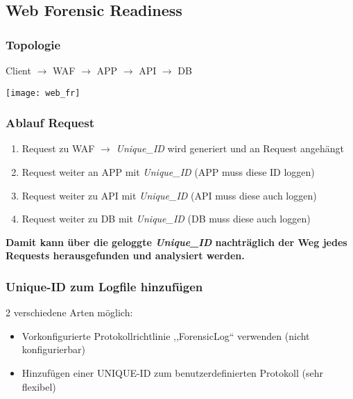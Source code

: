 \subsection{Web Forensic Readiness}

\subsubsection{Topologie}
Client $\rightarrow$ WAF $\rightarrow$ APP $\rightarrow$ API $\rightarrow$ DB

\begin{center}
    \texttt{[image: web\_fr]}
    \vspace{-8pt}
\end{center}

\subsubsection{Ablauf Request}
\begin{enumerate}
    \item Request zu WAF $\rightarrow$ \textit{Unique\_ID} wird generiert und an Request \glqq angehängt\grqq
    \item Request weiter an APP mit \textit{Unique\_ID} (APP muss diese ID loggen)
    \item Request weiter zu API mit \textit{Unique\_ID} (API muss diese auch loggen)
    \item Request weiter zu DB mit \textit{Unique\_ID} (DB muss diese auch loggen)\\
\end{enumerate}

\textbf{Damit kann über die geloggte \textit{Unique\_ID} nachträglich der Weg jedes Requests herausgefunden und analysiert werden.}

\subsubsection{Unique-ID zum Logfile hinzufügen}
2 verschiedene Arten möglich:
\begin{itemize}
    \item Vorkonfigurierte Protokollrichtlinie ,,ForensicLog`` verwenden (nicht konfigurierbar)
    \item Hinzufügen einer UNIQUE-ID zum benutzerdefinierten Protokoll (sehr flexibel)
\end{itemize}

